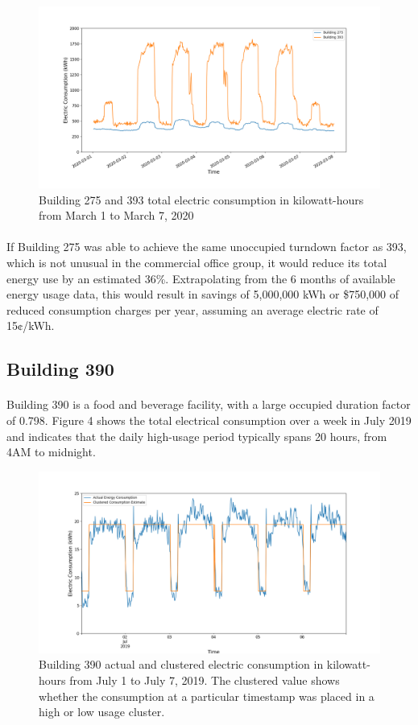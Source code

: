 \documentclass[a4paper]{article}
\begin{document}
\begin{figure}[H]
\centering
\includegraphics[width=.9\columnwidth]{./images/275v393_Turndown.png}
\caption{Building 275 and 393 total electric consumption in kilowatt-hours from March 1 to March 7, 2020}
\end{figure}

\paragraph{}
If Building 275 was able to achieve the same unoccupied turndown factor as 393, which is not unusual in the commercial office group, it would reduce its total energy use by an estimated 36\%. Extrapolating from the 6 months of available energy usage data, this would result in savings of 5,000,000 kWh or \$750,000 of reduced consumption charges per year, assuming an average electric rate of 15¢/kWh.

\subsection{Building 390}

\paragraph{}
Building 390 is a food and beverage facility, with a large occupied duration factor of 0.798. Figure 4 shows the total electrical consumption over a week in July 2019 and indicates that the daily high-usage period typically spans 20 hours, from 4AM to midnight.

\begin{figure}[H]
\centering
\includegraphics[width=.9\columnwidth]{./images/390_Duration.png}
\caption{Building 390 actual and clustered electric consumption in kilowatt-hours from July 1 to July 7, 2019. The clustered value shows whether the consumption at a particular timestamp was placed in a high or low usage cluster.}
\end{figure}
\end{document}
